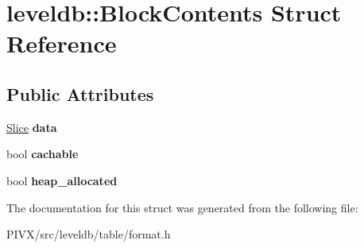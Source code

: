 \hypertarget{structleveldb_1_1_block_contents}{}\section{leveldb\+:\+:Block\+Contents Struct Reference}
\label{structleveldb_1_1_block_contents}
\subsection*{Public Attributes}
\begin{DoxyCompactItemize}
\item 
\mbox{\label{structleveldb_1_1_block_contents_aa30fe6388fe0f89d5565f6bae788c28e}} 
\mbox{\hyperlink{classleveldb_1_1_slice}{Slice}} {\bfseries data}
\item 
\mbox{\label{structleveldb_1_1_block_contents_ad9cbcf81fb1378ce5f9a0db2e8d4b539}} 
bool {\bfseries cachable}
\item 
\mbox{\label{structleveldb_1_1_block_contents_a0d4390fa3d4041ac5a3da51cbb16e315}} 
bool {\bfseries heap\+\_\+allocated}
\end{DoxyCompactItemize}


The documentation for this struct was generated from the following file\+:\begin{DoxyCompactItemize}
\item 
P\+I\+V\+X/src/leveldb/table/format.\+h\end{DoxyCompactItemize}
